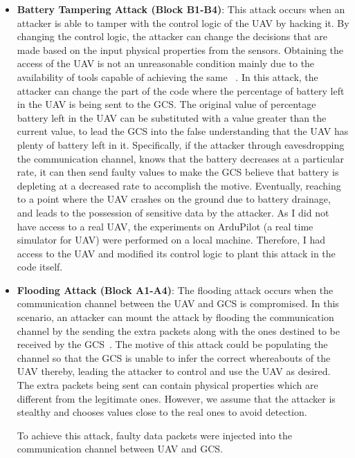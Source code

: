 \begin{itemize}
\item {\bf Battery Tampering Attack (Block B1-B4)}: This attack occurs when an attacker is able to tamper with the control logic of the UAV by hacking it. By changing the control logic, the attacker can change the decisions that are made based on the input physical properties from the sensors. Obtaining the access of the UAV is not an unreasonable condition mainly due to the availability of tools capable of achieving the same ~\cite{pleban2014hacking, rodday2016exploring}.
In this attack, the attacker can change the part of the code where the percentage of battery left in the UAV is being sent to the GCS. The original value of percentage battery left in the UAV can be substituted with a value greater than the current value, to lead the GCS into the false understanding that the UAV has plenty of battery left in it. Specifically, if the attacker through eavesdropping the communication channel, knows that the battery decreases at a particular rate, it can then send faulty values to make the GCS believe that battery is depleting at a decreased rate to accomplish the motive. Eventually, reaching to a point where the UAV crashes on the ground due to battery drainage, and leads to the possession of sensitive data by the attacker. As I did not have access to a real UAV, the experiments on ArduPilot (a real time simulator for UAV) were performed on a local machine. Therefore, I had access to the UAV and modified its control logic to plant this attack in the code itself.

\item {\bf Flooding Attack (Block A1-A4)}: The flooding attack occurs when the communication channel between the UAV and GCS is compromised. In this scenario, an attacker can mount the attack by flooding the communication channel by the sending the extra packets along with the ones destined to be received by the GCS~\cite{pleban2014hacking}. The motive of this attack could be populating the channel so that the GCS is unable to infer the correct whereabouts of the UAV thereby, leading the attacker to control and use the UAV as desired. The extra packets being sent can  contain physical properties which are different from the legitimate ones. However, we assume that the attacker is stealthy and chooses values close to the real ones to avoid detection. 

To achieve this attack, faulty data packets were injected into the communication channel between UAV and GCS.


\end{itemize}
